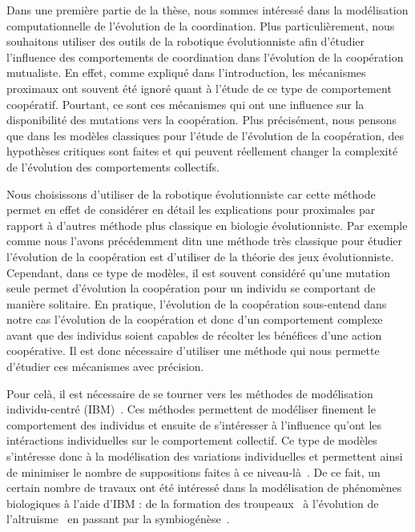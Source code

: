 		Dans une première partie de la thèse, nous sommes intéressé dans la modélisation computationnelle de l'évolution de la coordination. Plus particulièrement, nous souhaitons utiliser des outils de la robotique évolutionniste afin d'étudier l'influence des comportements de coordination dans l'évolution de la coopération mutualiste. En effet, comme expliqué dans l'introduction, les mécanismes proximaux ont souvent été ignoré quant à l'étude de ce type de comportement coopératif. Pourtant, ce sont ces mécanismes qui ont une influence sur la disponibilité des mutations vers la coopération. Plus précisément, nous pensons que dans les modèles classiques pour l'étude de l'évolution de la coopération, des hypothèses critiques sont faites et qui peuvent réellement changer la complexité de l'évolution des comportements collectifs.

		Nous choisissons d'utiliser de la robotique évolutionniste car cette méthode permet en effet de considérer en détail les explications pour proximales par rapport à d'autres méthode plus classique en biologie évolutionniste. Par exemple comme nous l'avons précédemment ditn une méthode très classique pour étudier l'évolution de la coopération est d'utiliser de la théorie des jeux évolutionniste. Cependant, dans ce type de modèles, il est souvent considéré qu'une mutation seule permet d'évolution la coopération pour un individu se comportant de manière solitaire. En pratique, l'évolution de la coopération sous-entend dans notre cas l'évolution de la coopération et donc d'un comportement complexe avant que des individus soient capables de récolter les bénéfices d'une action coopérative. Il est donc nécessaire d'utiliser une méthode qui nous permette d'étudier ces mécanismes avec précision.

		Pour celà, il est nécessaire de se tourner vers les méthodes de modélisation individu-centré (IBM)~\parencite{Huston1988}. Ces méthodes permettent de modéliser finement le comportement des individus et ensuite de s'intéresser à l'influence qu'ont les intéractions individuelles sur le comportement collectif. Ce type de modèles s'intéresse donc à la modélisation des variations individuelles et permettent ainsi de minimiser le nombre de suppositions faites à ce niveau-là~\parencite{Adami2014}. De ce fait, un certain nombre de travaux ont été intéressé dans la modélisation de phénomènes biologiques à l'aide d'IBM : de la formation des troupeaux~\parencite{Olson2013a, Haley2014, Olson2016} à l'évolution de l'altruisme~\parencite{Wilder2015} en passant par la symbiogénèse~\parencite{Watson1992}.


